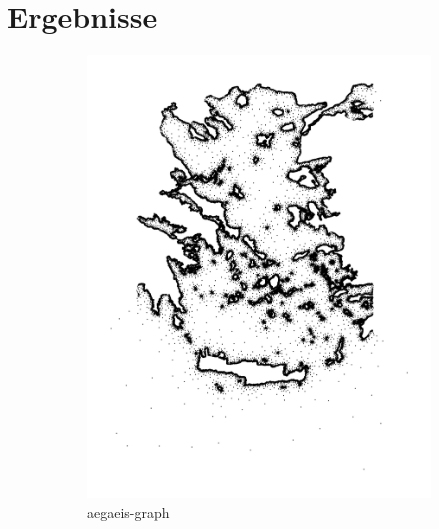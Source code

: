 \chapter{Ergebnisse}


\begin{figure}
    \centering
    \begin{subfigure}[b]{0.35\textwidth}
        \centering
        \includegraphics[width=\textwidth]{img/base_graphs/aegaeis-ref-graph.png}
        \caption{aegaeis-graph}
    \end{subfigure}
    \hfill
    \begin{subfigure}[b]{0.35\textwidth}
        \centering

\end{subfigure}
\end{figure}
